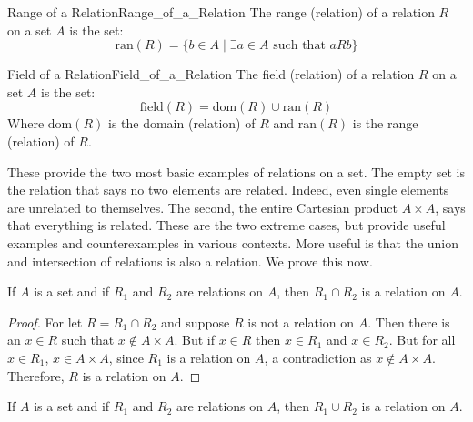     \begin{fdefinition}{Range of a Relation}{Range_of_a_Relation}
        The \gls{range (relation)} of a \gls{relation} $R$ on a \gls{set} $A$ is
        the set:
        \begin{equation*}
            \textrm{ran}(R)=\big\{b\in{A}\;|\;\exists{a}\in{A}
                \textrm{ such that }aRb\big\}
        \end{equation*}
    \end{fdefinition}
    \begin{fdefinition}{Field of a Relation}{Field_of_a_Relation}
        The \gls{field (relation)} of a \gls{relation} $R$ on a set $A$ is the
        set:
        \begin{equation*}
            \textrm{field}(R)=\textrm{dom}(R)\cup\textrm{ran}(R)
        \end{equation*}
        Where $\textrm{dom}(R)$ is the \gls{domain (relation)} of $R$ and
        $\textrm{ran}(R)$ is the \gls{range (relation)} of $R$.
    \end{fdefinition}
    These provide the two most basic examples of relations on a
    set. The empty set is the relation that says no two elements
    are related. Indeed, even single elements are unrelated to
    themselves. The second, the entire Cartesian product
    $A\times{A}$, says that everything is related. These are the
    two extreme cases, but provide useful examples and
    counterexamples in various contexts. More useful is that the
    union and intersection of relations is also a relation. We
    prove this now.
    \begin{theorem}
        \label{thm:Intersection_of_Relations_Is_Relation}%
        If $A$ is a set and if $R_{1}$ and $R_{2}$ are relations
        on $A$, then $R_{1}\cap{R}_{2}$ is a relation on $A$.
    \end{theorem}
    \begin{proof}
        For let $R=R_{1}\cap{R}_{2}$ and suppose $R$ is not a
        relation on $A$. Then there is an $x\in{R}$ such that
        $x\notin{A}\times{A}$. But if $x\in{R}$ then
        $x\in{R}_{1}$ and $x\in{R}_{2}$. But for all
        $x\in{R}_{1}$, $x\in{A}\times{A}$, since $R_{1}$ is a
        relation on $A$, a contradiction as
        $x\notin{A}\times{A}$. Therefore, $R$ is a relation on
        $A$.
    \end{proof}
    \begin{theorem}
        \label{thm:Set_Theory_Union_of_Relations_Is_Relation}
        If $A$ is a set and if $R_{1}$ and $R_{2}$ are relations
        on $A$, then $R_{1}\cup{R}_{2}$ is a relation on $A$.
    \end{theorem}

